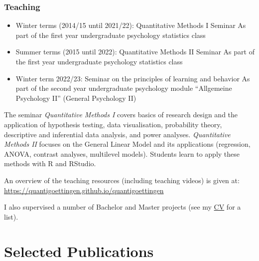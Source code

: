 \documentclass[
]{article}
\begin{document}
\hypertarget{teaching}{%
\subsubsection{Teaching}\label{teaching}}

\begin{itemize}
\item
  Winter terms (2014/15 until 2021/22): Quantitative Methods I Seminar
  As part of the first year undergraduate psychology statistics class
\item
  Summer terms (2015 until 2022): Quantitative Methods II Seminar As
  part of the first year undergraduate psychology statistics class
\item
  Winter term 2022/23: Seminar on the principles of learning and
  behavior As part of the second year undergraduate psychology module
  ``Allgemeine Psychology II'' (General Psychology II)
\end{itemize}

The seminar \emph{Quantitative Methods I} covers basics of research
design and the application of hypothesis testing, data visualisation,
probability theory, descriptive and inferential data analysis, and power
analyses. \emph{Quantitative Methods II} focuses on the General Linear
Model and its applications (regression, ANOVA, contrast analyses,
multilevel models). Students learn to apply these methods with R and
RStudio.

An overview of the teaching resources (including teaching videos) is
given at: \url{https://quantigoettingen.github.io/quantigoettingen}

I also supervised a number of Bachelor and Master projects (see my
\href{https://www.simonstephan.com/cv/simonstephan_cv.pdf}{CV} for a
list).

\hfill\break

\hypertarget{selected-publications}{%
\section{Selected Publications}\label{selected-publications}}
\end{document}
